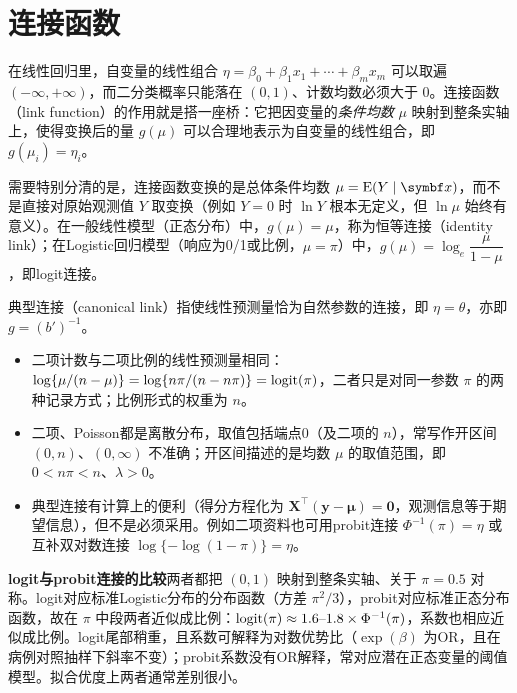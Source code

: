 \section{连接函数}
在线性回归里，自变量的线性组合 $\eta=\beta_0+\beta_1x_1+\cdots+\beta_mx_m$ 可以取遍 $(-\infty,+\infty)$，而二分类概率只能落在 $(0,1)$、计数均数必须大于 $0$。连接函数（link function）的作用就是搭一座桥：它把因变量的\emph{条件均数} $\mu$ 映射到整条实轴上，使得变换后的量 $g(\mu)$ 可以合理地表示为自变量的线性组合，即 $g(\mu_i)=\eta_i$。

需要特别分清的是，连接函数变换的是总体条件均数 $\mu=\E(Y\mid\bm x)$，而不是直接对原始观测值 $Y$ 取变换（例如 $Y=0$ 时 $\ln Y$ 根本无定义，但 $\ln\mu$ 始终有意义）。在一般线性模型（正态分布）中，$g(\mu)=\mu$，称为恒等连接（identity link）；在Logistic回归模型（响应为0/1或比例，$\mu=\pi$）中，$g(\mu)=\log_e\dfrac{\mu}{1-\mu}$，即logit连接。

典型连接（canonical link）指使线性预测量恰为自然参数的连接，即 $\eta=\theta$，亦即 $g=(b')^{-1}$。
\begin{itemize}
\item 二项计数与二项比例的线性预测量相同：$\log\{\mu/(n-\mu)\}=\log\{n\pi/(n-n\pi)\}=\operatorname{logit}(\pi)$，二者只是对同一参数 $\pi$ 的两种记录方式；比例形式的权重为 $n$。
\item 二项、Poisson都是离散分布，取值包括端点0（及二项的 $n$），常写作开区间 $(0,n)$、$(0,\infty)$ 不准确；开区间描述的是均数 $\mu$ 的取值范围，即 $0<n\pi<n$、$\lambda>0$。
\item 典型连接有计算上的便利（得分方程化为 $\bm X^\top(\bm y-\bm\mu)=\bm 0$，观测信息等于期望信息），但不是必须采用。例如二项资料也可用probit连接 $\Phi^{-1}(\pi)=\eta$ 或互补双对数连接 $\log\{-\log(1-\pi)\}=\eta$。
\end{itemize}
\textbf{logit与probit连接的比较}\quad 两者都把 $(0,1)$ 映射到整条实轴、关于 $\pi=0.5$ 对称。logit对应标准Logistic分布的分布函数（方差 $\pi^2/3$），probit对应标准正态分布函数，故在 $\pi$ 中段两者近似成比例：$\operatorname{logit}(\pi)\approx1.6\text{--}1.8\times\Phi^{-1}(\pi)$，系数也相应近似成比例。logit尾部稍重，且系数可解释为对数优势比（$\exp(\beta)$ 为OR，且在病例对照抽样下斜率不变）；probit系数没有OR解释，常对应潜在正态变量的阈值模型。拟合优度上两者通常差别很小。
